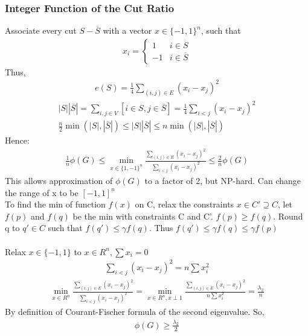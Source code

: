 \documentclass[12pt, letterpaper]{report}
\begin{document}
    \subsubsection{Integer Function of the Cut Ratio}
    Associate every cut $S-\overline{S}$ with a vector $x\in \{-1, 1\}^n$, such that
    \begin{gather*}
        x_i = \begin{cases}
            1 & i \in S\\
            -1 & i \in \overline{S}
        \end{cases}
    \end{gather*}
    Thus,
    \begin{gather*}
        e(S) = \frac{1}{4} \sum_{(i,j)\in E}(x_i-x_j)^2
    \end{gather*}
    \begin{gather*}
        |S||\overline{S}| = \sum_{i,j \in V}[i \in S, j \in \overline{S}] = \frac{1}{4}\sum_{i<j}(x_i-x_j)^2\\
        \frac{n}{2}\min(|S|,|\overline{S}|)\leq |S||\overline{S}| \leq n \min{(|S|, |\overline{S}|)}
    \end{gather*}
    Hence:
    \begin{gather*}
        \frac{1}{n}\phi(G) \leq \min_{x\in \{1,-1\}^n}\frac{\sum_{(i,j)\in E}(x_i-x_j)^2}{\sum_{i<j}(x_i-x_j)^2} \leq \frac{2}{n}\phi(G)
    \end{gather*}
    This allows approximation of $\phi(G)$ to a factor of 2, but NP-hard. Can change the range of x to be $[-1, 1]^n$\\
    \indent To find the min of function $f(x)$ on C, relax the constraints $x\in C'\supseteq C$, let $f(p)$ and $f(q)$ be the min with 
    constraints C and C'. $f(p)\geq f(q)$. Round q to $q'\in C$ such that $f(q') \leq \gamma f(q)$. Thus $f(q')\leq\gamma f(q)\leq\gamma f(p)$\\\\
    Relax $x\in\{-1, 1\}$ to $x\in R^n, \sum{x_i}=0$
    \begin{gather*}
        \sum_{i<j}(x_i-x_j)^2=n\sum{x_i^2}
    \end{gather*}
    \begin{gather*}
        \min_{x\in R^n}\frac{\sum_{(i,j)\in E}(x_i-x_j)^2}{\sum_{i<j}(x_i-x_j)^2} = \min_{x\in R^n, x\perp 1}\frac{\sum_{(i,j)\in E}(x_i-x_j)^2}{n\sum x_i^2}=\frac{\lambda_2}{n}
    \end{gather*}
    By definition of Courant-Fischer formula of the second eigenvalue. So,
    \begin{gather*}
        \phi(G) \geq \frac{\lambda_2}{2}
    \end{gather*}
\end{document}
